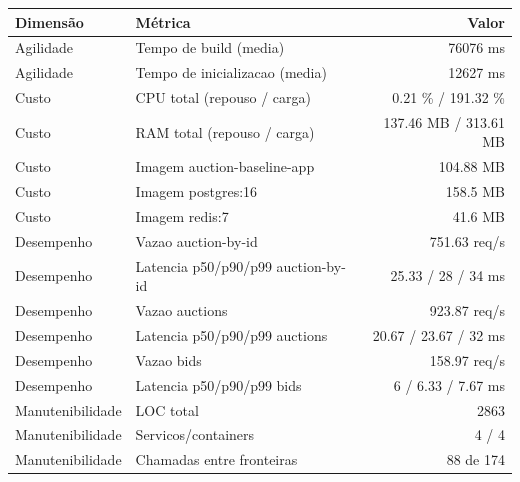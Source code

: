 \begin{quadro}[htb]
  \centering
  \caption{Métricas (auction, capacidade-negocio, snapshot-0).}
  \label{qua:metricas-auction-capacidade-negocio-snapshot-0}
  \renewcommand{\arraystretch}{1.15}
  \begin{tabular}{|l|l|r|}
    \hline
    \textbf{Dimensão} & \textbf{Métrica} & \textbf{Valor} \\
    \hline
    Agilidade & Tempo de build (media) & 76076 ms \\ \hline
    Agilidade & Tempo de inicializacao (media) & 12627 ms \\ \hline
    Custo & CPU total (repouso / carga) & 0.21 \% / 191.32 \% \\ \hline
    Custo & RAM total (repouso / carga) & 137.46 MB / 313.61 MB \\ \hline
    Custo & Imagem auction-baseline-app & 104.88 MB \\ \hline
    Custo & Imagem postgres:16 & 158.5 MB \\ \hline
    Custo & Imagem redis:7 & 41.6 MB \\ \hline
    Desempenho & Vazao auction-by-id & 751.63 req/s \\ \hline
    Desempenho & Latencia p50/p90/p99 auction-by-id & 25.33 / 28 / 34 ms \\ \hline
    Desempenho & Vazao auctions & 923.87 req/s \\ \hline
    Desempenho & Latencia p50/p90/p99 auctions & 20.67 / 23.67 / 32 ms \\ \hline
    Desempenho & Vazao bids & 158.97 req/s \\ \hline
    Desempenho & Latencia p50/p90/p99 bids & 6 / 6.33 / 7.67 ms \\ \hline
    Manutenibilidade & LOC total & 2863 \\ \hline
    Manutenibilidade & Servicos/containers & 4 / 4 \\ \hline
    Manutenibilidade & Chamadas entre fronteiras & 88 de 174 \\ \hline
  \end{tabular}
\end{quadro}
